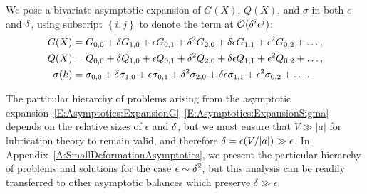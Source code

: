 \documentclass{jfm}
\begin{document}
We pose a bivariate asymptotic expansion of $G(X)$, $Q(X)$, and $\sigma$ in both $\epsilon$ and $\delta$, using subscript $\left\{i,j\right\}$ to denote the term at $\mathcal{O}(\delta^i \epsilon^j)$:
\begin{align}
G(X) &=    G_{0,0} + \delta G_{1,0} + \epsilon G_{0,1} +  \delta^2 G_{2,0} + \delta \epsilon G_{1,1} + \epsilon^2 G_{0,2} + \dots,\label{E:Asymptotics:ExpansionG} \\
Q(X) &=  Q_{0,0} + \delta Q_{1,0} + \epsilon Q_{0,1} +  \delta^2 Q_{2,0} + \delta \epsilon Q_{1,1} + \epsilon^2 Q_{0,2}+\dots,\label{E:Asymptotics:ExpansionQ} \\
\sigma(k) &= \sigma_{0,0} + \delta \sigma_{1,0} + \epsilon \sigma_{0,1} +  \delta^2 \sigma_{2,0} + \delta \epsilon \sigma_{1,1} + \epsilon^2 \sigma_{0,2} + \dots. \label{E:Asymptotics:ExpansionSigma}
\end{align}

The particular hierarchy of problems arising from the asymptotic expansion~\eqref{E:Asymptotics:ExpansionG}--\eqref{E:Asymptotics:ExpansionSigma} depends on the relative sizes of $\epsilon$ and $\delta$, but we must ensure that $V \gg |a|$ for lubrication theory to remain valid, and therefore
$\delta  = \epsilon (V/|a|) \gg \epsilon$.  In Appendix~\ref{A:SmallDeformationAsymptotics}, we present the particular hierarchy of problems and solutions for the case $\epsilon \sim \delta^2$, but this analysis can be readily transferred to other asymptotic balances which preserve $\delta \gg \epsilon$.
\end{document}
